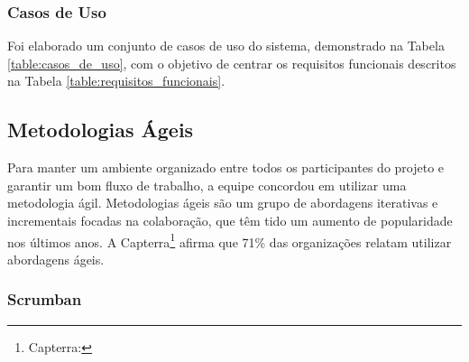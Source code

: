 \subsubsection{Casos de Uso}


Foi elaborado um conjunto de casos de uso do sistema, demonstrado na
Tabela \ref{table:casos_de_uso}, com o objetivo de centrar os
requisitos funcionais descritos na Tabela \ref{table:requisitos_funcionais}.


\begin{table}[H]
    \centering
    \caption{Casos de Uso do sistema.}
    \label{table:casos_de_uso}
\end{table}


\subsection{Metodologias Ágeis}

Para manter um ambiente organizado entre todos os participantes do
projeto e garantir um bom fluxo de trabalho, a equipe concordou em
utilizar uma metodologia ágil. Metodologias ágeis são um grupo de
abordagens iterativas e incrementais focadas na colaboração, que têm
tido um aumento de popularidade nos últimos anos. A Capterra\footnote{Capterra:
}
afirma que 71\% das organizações relatam utilizar abordagens ágeis.

\subsubsection{Scrumban}

